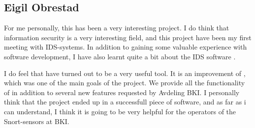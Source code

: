 \subsection{Eigil Obrestad}
For me personally, this has been a very interesting project. I do think that
information security is a very interesting field, and this project have been my
first meeting with IDS-systems. In addition to gaining some valuable experience
with software development, I have also learnt quite a bit about the IDS software
\snort{}.

I do feel that \snowman{} have turned out to be a very useful tool. It is an
improvement of \bhtb{}, which was one of the main goals of the project. We
provide all the functionality of \bhtb{} in addition to several new features
requested by Avdeling BKI. I personally think that the project ended up in a
successfull piece of software, and as far as i can understand, I think it is
going to be very helpful for the operators of the Snort-sensors at BKI.
